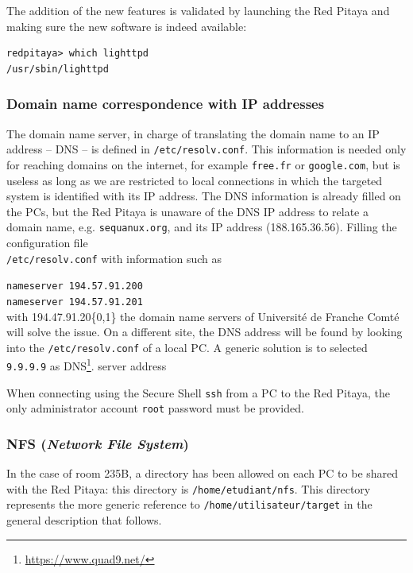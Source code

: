 \documentclass{article}
\begin{document}
{The addition of the new features is validated by launching the Red Pitaya and
making sure the new software is indeed available:
\begin{verbatim}
redpitaya> which lighttpd                                                       
/usr/sbin/lighttpd
\end{verbatim}

\subsubsection{Domain name correspondence with IP addresses}

{\color{red}
The domain name server, in charge of translating the domain name to an IP address -- DNS --
is defined in {\tt /etc/resolv.conf}. This information is needed only for reaching
domains on the internet, for example {\tt free.fr} or {\tt google.com}, but is useless
as long as we are restricted to local connections in which the targeted system is
identified with its IP address. The DNS information is already filled on the PCs, but the
Red Pitaya is unaware of the DNS IP address to relate a domain name, e.g. {\tt sequanux.org},
and its IP address (188.165.36.56). Filling the configuration file \\{\tt /etc/resolv.conf} 
with information such as

{\tt nameserver 194.57.91.200 \\
nameserver 194.57.91.201}\\
with 194.47.91.20\{0,1\} the domain name servers of Universit\'e de 
Franche Comt\'e will solve the issue. On a different site, the DNS address will be found
by looking into the {\tt /etc/resolv.conf} of a local PC. A generic solution is
to selected {\tt 9.9.9.9} as DNS\footnote{\url{https://www.quad9.net/}}.
server address
}

When connecting using the Secure Shell {\tt ssh} from a PC to the Red Pitaya, the only administrator
account {\tt root} password must be provided.


\subsubsection{NFS ({\em Network File System})}\label{nfsexport}

In the case of room 235B, a directory has been allowed on each PC to be shared with the
Red Pitaya: this directory is {\tt /home/etudiant/nfs}. This directory represents the more generic
reference to {\tt /home/utilisateur/target} in the general description that follows.

}
\end{document}
